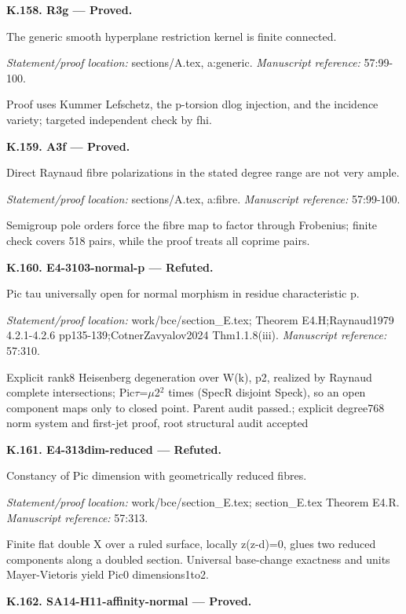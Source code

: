 \par\medskip\noindent\textbf{K.158. R3g --- Proved.}\par
The generic smooth hyperplane restriction kernel is finite connected.
\par\emph{Statement/proof location:} sections/A.tex, a:generic.
\emph{Manuscript reference:} 57:99-100.
\par Proof uses Kummer Lefschetz, the p-torsion dlog injection, and the incidence variety; targeted independent check by fhi.
\par\medskip\noindent\textbf{K.159. A3f --- Proved.}\par
Direct Raynaud fibre polarizations in the stated degree range are not very ample.
\par\emph{Statement/proof location:} sections/A.tex, a:fibre.
\emph{Manuscript reference:} 57:99-100.
\par Semigroup pole orders force the fibre map to factor through Frobenius; finite check covers 518 pairs, while the proof treats all coprime pairs.
\par\medskip\noindent\textbf{K.160. E4-3103-normal-p --- Refuted.}\par
Pic tau universally open for normal morphism in residue characteristic p.
\par\emph{Statement/proof location:} work/bce/section\_E.tex; Theorem E4.H;Raynaud1979 4.2.1-4.2.6 pp135-139;CotnerZavyalov2024 Thm1.1.8(iii).
\emph{Manuscript reference:} 57:310.
\par Explicit rank8 Heisenberg degeneration over W(k), p2, realized by Raynaud complete intersections; Pic\ensuremath{\tau}=\ensuremath{\mu}2\ensuremath{{}^2} times (SpecR disjoint Speck), so an open component maps only to closed point. Parent audit passed.; explicit degree768 norm system and first-jet proof, root structural audit accepted
\par\medskip\noindent\textbf{K.161. E4-313dim-reduced --- Refuted.}\par
Constancy of Pic dimension with geometrically reduced fibres.
\par\emph{Statement/proof location:} work/bce/section\_E.tex; section\_E.tex Theorem E4.R.
\emph{Manuscript reference:} 57:313.
\par Finite flat double X over a ruled surface, locally z(z-d)=0, glues two reduced components along a doubled section. Universal base-change exactness and units Mayer-Vietoris yield Pic0 dimensions1to2.
\par\medskip\noindent\textbf{K.162. SA14-H11-affinity-normal --- Proved.}\par
